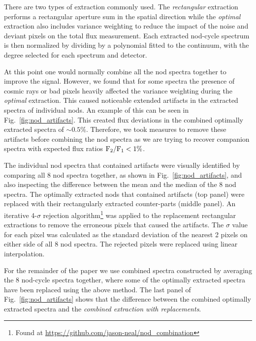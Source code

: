 There are two types of extraction commonly used. The \emph{rectangular} extraction performs a rectangular aperture sum in the spatial direction while the \emph{optimal} extraction \citep{horne_optimal_1986} also includes variance weighting to reduce the impact of the noise and deviant pixels on the total flux measurement. Each extracted nod-cycle spectrum is then normalized by dividing by a polynomial fitted to the continuum, with the degree selected for each spectrum and detector.

At this point one would normally combine all the nod spectra together to improve the signal. However, we found that for some spectra the presence of cosmic rays or bad pixels heavily affected the variance weighting during the \emph{optimal} extraction. This caused noticeable extended artifacts in the extracted spectra of individual nods. An example of this can be seen in Fig.~\ref{fig:nod_artifacts}. This created flux deviations in the combined optimally extracted spectra of \(\sim 0.5\% \).  Therefore, we took measures to remove these artifacts before combining the nod spectra as we are trying to recover companion spectra with expected flux ratios \(\rm {F_2}/{F_1} < 1\% \). 

The individual nod spectra that contained artifacts were visually identified by comparing all 8 nod spectra together, as shown in Fig.~\ref{fig:nod_artifacts}, and also inspecting the difference between the mean and the median of the 8 nod spectra. The optimally extracted nods that contained artifacts (top panel) were replaced with their rectangularly extracted counter-parts (middle panel). An iterative 4-\(\sigma \) rejection algorithm\footnote{Found at \url{https://github.com/jason-neal/nod_combination}} was applied to the replacement rectangular extractions to remove the erroneous pixels that caused the artifacts. The \(\sigma\) value for each pixel was calculated as the standard deviation of the nearest 2 pixels on either side of all 8 nod spectra. The rejected pixels were replaced using linear interpolation.

For the remainder of the paper we use combined spectra constructed by averaging the 8 nod-cycle spectra together, where some of the optimally extracted spectra have been replaced using the above method. The last panel of Fig.~\ref{fig:nod_artifacts} shows that the difference between the combined optimally extracted spectra and the \emph{combined extraction with replacements}.

